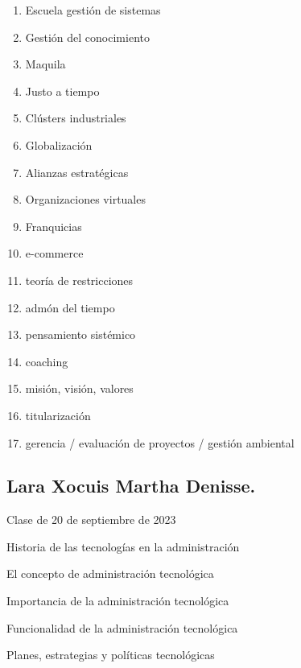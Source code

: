 \documentclass[letterpaper,12pt]{article}
\begin{document}
\begin{sloppypar}
\begin{enumerate}
    \item Escuela gestión de sistemas
    \item Gestión del conocimiento 
    \item Maquila 
    \item Justo a tiempo 
    \item Clústers industriales 
    \item Globalización 
    \item Alianzas estratégicas 
    \item Organizaciones virtuales 
    \item Franquicias
    \item e-commerce 
    \item teoría de restricciones 
    \item admón del tiempo 
    \item pensamiento sistémico 
    \item coaching 
    \item misión, visión, valores 
    \item titularización 
    \item gerencia / evaluación de proyectos / gestión ambiental 
\end{enumerate}

\newpage
\subsection*{Lara Xocuis Martha Denisse.}
Clase de 20 de septiembre de 2023

Historia de las tecnologías en la administración

El concepto de administración tecnológica

Importancia de la administración tecnológica

Funcionalidad de la administración tecnológica

Planes, estrategias y políticas tecnológicas


\end{sloppypar}
\end{document}
